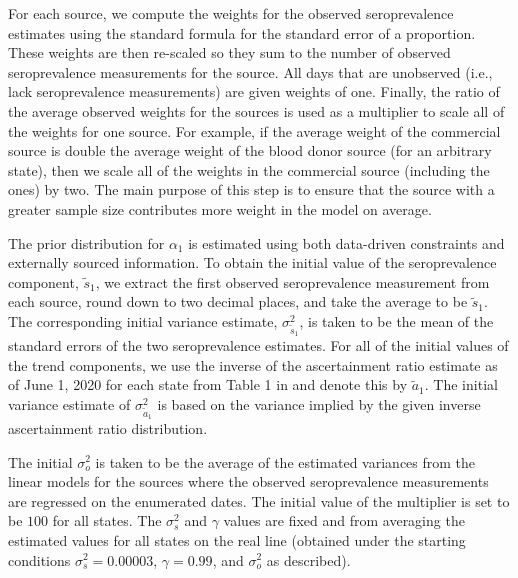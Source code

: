 \documentclass{article}
\begin{document}
For each source, we compute the weights for the observed seroprevalence
estimates using the standard formula for the standard error of a proportion.
These weights are then re-scaled so they sum to the number of observed
seroprevalence measurements for the source. All days that are unobserved (i.e.,
lack seroprevalence measurements) are given weights of one. Finally, the ratio
of the average observed weights for the sources is used as a multiplier to scale
all of the weights for one source. For example, if the average weight of the
commercial source is double the average weight of the blood donor source (for an
arbitrary state), then we scale all of the weights in the commercial source
(including the ones) by two. The main purpose of this step is to ensure that
the source with a greater sample size contributes more weight in the model on
average. %

The prior distribution for $\alpha_1$ is estimated using both data-driven constraints 
and externally sourced information. To obtain the initial value of the seroprevalence 
component, $\tilde{s}_{1}$, we extract the first observed seroprevalence measurement from 
each source, round down to two decimal places, and take the average to be $\tilde{s}_{1}$. 
The corresponding initial
variance estimate, $\sigma^2_{\tilde{s}_{1}}$, is taken to be the mean of the standard
errors of the two seroprevalence estimates. For all of the initial values of the trend 
components, we use the inverse of the ascertainment ratio estimate as of June 1, 2020 
for each state from Table 1 in \citet{unwin2020state} and denote this by $\tilde{a}_1$. The
initial variance estimate of $\sigma^2_{\tilde{a}_1}$ is based on the variance implied 
by the given inverse ascertainment ratio distribution.

The initial $\sigma^2_o$ is taken to be the average of the estimated variances
from the linear models for the sources where the observed seroprevalence
measurements are regressed on the enumerated dates. The initial value of 
the multiplier is set to be $100$ for all states. The $\sigma^2_s$ and $\gamma$ 
values are fixed and from averaging the estimated values for all states on the real line
(obtained under the starting conditions $\sigma^2_s = 0.00003$, $\gamma = 0.99$,
and $\sigma^2_o$ as described).
\end{document}
